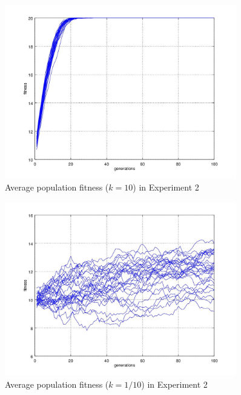 \documentclass{article}
\begin{document}
\begin{figure}

\centering
\includegraphics[keepaspectratio,width=0.9\textwidth]{experiment2figure2_10.jpg}

\caption{Average population fitness ($k = 10$) in Experiment 2}

\label{fig:experiment2_10}

\end{figure}

\begin{figure}

\centering
\includegraphics[keepaspectratio,width=0.9\textwidth]{experiment2figure2_01.jpg}

\caption{Average population fitness ($k = 1/10$) in Experiment 2}

\label{fig:experiment2_01}

\end{figure}
\end{document}
